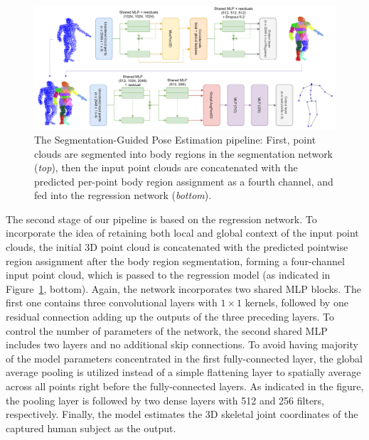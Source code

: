 \vspace{5mm}
\begin{figure}[H]
\begin{center}
  \includegraphics[width=\textwidth]{images/implementation/4chan_pipeline_mine2.png}
  \caption[The Segmentation-Guided Pose Estimation pipeline.]{ The Segmentation-Guided Pose Estimation pipeline: First, point clouds are segmented into body regions in the segmentation network ({\it top}), then the input point clouds are concatenated with the predicted per-point body region assignment as a fourth channel, and fed into the regression network ({\it bottom}).}
  \label{fig:4chan_pipeline}
\end{center}
\end{figure}

\noindent The second stage of our pipeline is based on the regression network. To incorporate the idea of retaining both local and global context of the input point clouds, the initial 3D point cloud is concatenated with the predicted pointwise region assignment after the body region segmentation, forming a four-channel input point cloud, which is passed to the regression model (as indicated in Figure~\ref{fig:4chan_pipeline}, bottom). Again, the network incorporates two shared MLP blocks. The first one contains three convolutional layers with $1 \times 1$ kernels, followed by one residual connection adding up the outputs of the three preceding layers. To control the number of parameters of the network, the second shared MLP includes two layers and no additional skip connections. To avoid having majority of the model parameters concentrated in the first fully-connected layer, the global average pooling is utilized instead of a simple flattening layer to spatially average across all points right before the fully-connected layers. As indicated in the figure, the pooling layer is followed by two dense layers with 512 and 256 filters, respectively. Finally, the model estimates the 3D skeletal joint coordinates of the captured human subject as the output.\par

